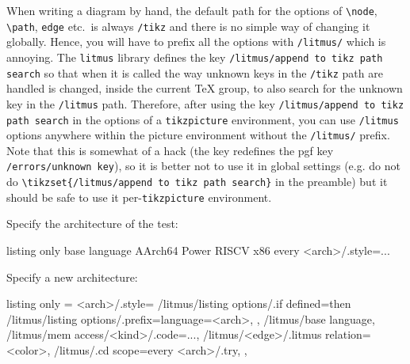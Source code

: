 \documentclass[a4paper]{article}
\begin{document}
When writing a diagram by hand, the default path for the options of
\lstinline|\node|, \lstinline|\path|, \lstinline|edge| etc.\ is always \lstinline|/tikz|
and there is no simple way of changing it globally.
Hence, you will have to prefix all the options with \lstinline|/litmus/| which
is annoying.
The \lstinline|litmus| library defines the key
\lstinline|/litmus/append to tikz path search| so that when it is called the
way unknown keys in the \lstinline|/tikz| path are handled is changed, inside
the current \TeX{} group, to also search for the unknown key in the
\lstinline|/litmus| path.
Therefore, after using the key \lstinline|/litmus/append to tikz path search|
in the options of a \lstinline|tikzpicture| environment, you can use
\lstinline|/litmus| options anywhere within the picture environment without
the \lstinline|/litmus/| prefix.
Note that this is somewhat of a hack (the key redefines the pgf key
\lstinline|/errors/unknown key|), so it is better not to use it in global
settings (e.g. do not do \lstinline+\tikzset{/litmus/append to tikz path search}+
in the preamble) but it should be safe to use it per-\lstinline|tikzpicture|
environment.

\vspace{2cm}

Specify the architecture of the test:
\begin{tcblisting}{listing only}
base language %
AArch64
Power
RISCV
x86
every <arch>/.style={...}
\end{tcblisting}

Specify a new architecture:
\begin{tcblisting}{listing only}
\litmusset={
  <arch>/.style={
    /litmus/listing options/.if defined=then {
      /litmus/listing options/.prefix={language=<arch>,}
    },
    /litmus/base language, %
    /litmus/mem access/<kind>/.code={...},%
    /litmus/<edge>/.litmus relation=<color>,
    /litmus/.cd scope={every <arch>/.try},
  },
}
\end{tcblisting}
\end{document}
